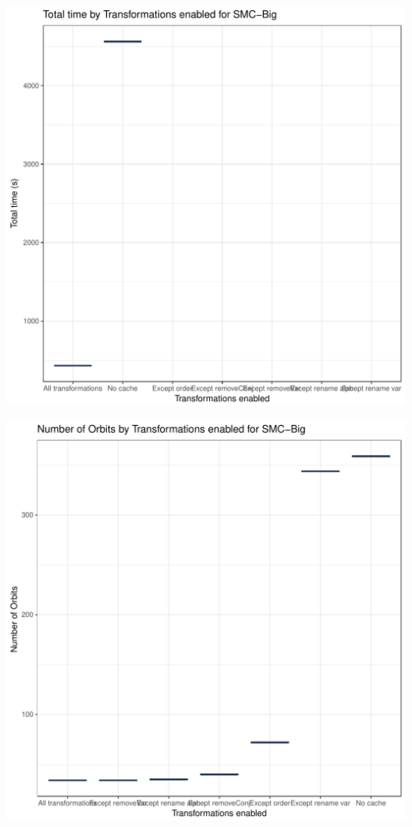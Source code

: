 \documentclass{article}\usepackage[]{graphicx}\usepackage[]{color}
\makeatletter
\def\maxwidth{ %
  \ifdim\Gin@nat@width>\linewidth
    \linewidth
  \else
    \Gin@nat@width
  \fi
}
\newenvironment{knitrout}{}{} %
\makeatother
\begin{document}
\begin{knitrout}
\includegraphics[width=\maxwidth]{figure/big-3} 

\includegraphics[width=\maxwidth]{figure/big-4} 

\end{knitrout}
\end{document}
